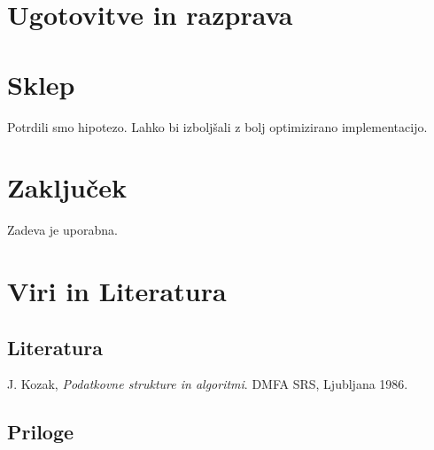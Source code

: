 \documentclass[a4paper,oneside]{article}
\begin{document}
\section{Ugotovitve in razprava}
\section{Sklep}
Potrdili smo hipotezo. Lahko bi izboljšali z bolj optimizirano implementacijo.
\section{Zaključek}
Zadeva je uporabna.
\section{Viri in Literatura}
\subsection{Literatura}
\vspace{-1cm}
\begin{thebibliography}{99}
   {J. Kozak, \emph{Podatkovne strukture in algoritmi}. DMFA SRS, Ljubljana 1986. }
\end{thebibliography}
\subsection{Priloge}
\end{document}
